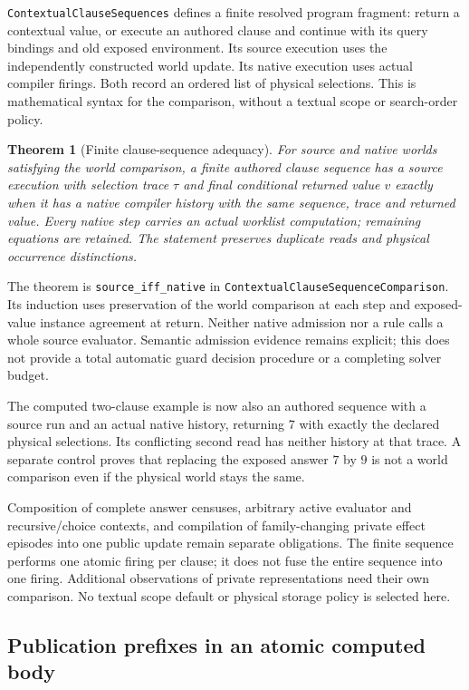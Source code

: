 \documentclass[11pt]{article}
\newtheorem{theorem}{Theorem}
\newcommand{\code}[1]{\texttt{\small #1}}
\begin{document}
\code{ContextualClauseSequences} defines a finite resolved program fragment:
return a contextual value, or execute an authored clause and continue with
its query bindings and old exposed environment. Its source execution uses
the independently constructed world update. Its native execution uses
actual compiler firings. Both record an ordered list of physical selections.
This is mathematical syntax for the comparison, without a textual scope
or search-order policy.

\begin{theorem}[Finite clause-sequence adequacy]
For source and native worlds satisfying the world comparison, a finite
authored clause sequence has a source execution with selection trace $\tau$
and final conditional returned value $v$ exactly when it has a native
compiler history with the same sequence, trace and returned value.
Every native step carries an actual worklist computation; remaining
equations are retained. The statement preserves duplicate reads and
physical occurrence distinctions.
\end{theorem}
The theorem is \code{source\_iff\_native} in
\code{ContextualClauseSequenceComparison}. Its induction uses preservation
of the world comparison at each step and exposed-value instance agreement
at return. Neither native admission nor a rule calls a whole source evaluator.
Semantic admission evidence remains explicit; this does not provide a
total automatic guard decision procedure or a completing solver budget.

The computed two-clause example is now also an authored sequence with a
source run and an actual native history, returning $7$ with exactly the
declared physical selections. Its conflicting second read has neither
history at that trace. A separate control proves that replacing the
exposed answer $7$ by $9$ is not a world comparison even if the physical
world stays the same.

Composition of complete answer censuses, arbitrary active evaluator and
recursive/choice contexts, and compilation of family-changing private
effect episodes into one public update remain separate obligations.
The finite sequence performs one atomic firing per clause; it does not
fuse the entire sequence into one firing. Additional observations of
private representations need their own comparison. No textual scope
default or physical storage policy is selected here.

\subsection{Publication prefixes in an atomic computed body}
\end{document}
